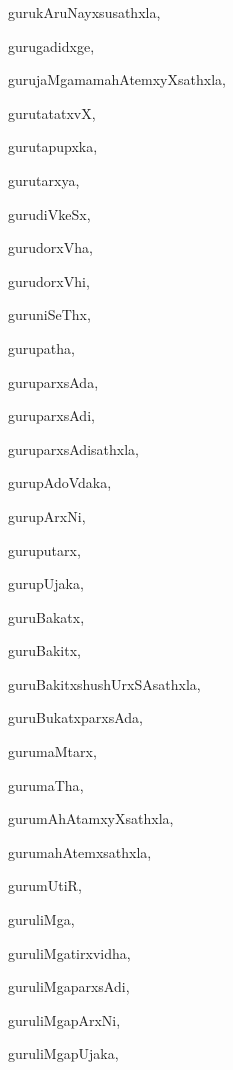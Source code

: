 \begin{multicols}{2}
{gurukAruNayxsusathxla}, \pageref{gurukAruNayxsusathxla}

{gurugadidxge}, \pageref{gurugadidxge}

{gurujaMgamamahAtemxyXsathxla}, \pageref{gurujaMgamamahAtemxyXsathxla}

{gurutatatxvX}, \pageref{gurutatatxvX}

{gurutapupxka}, \pageref{gurutapupxka}

{gurutarxya}, \pageref{gurutarxya}

{gurudiVkeSx}, \pageref{gurudiVkeSx}

{gurudorxVha}, \pageref{gurudorxVha}

{gurudorxVhi}, \pageref{gurudorxVhi}

{guruniSeThx}, \pageref{guruniSeThx}

{gurupatha}, \pageref{gurupatha}

{guruparxsAda}, \pageref{guruparxsAda}

{guruparxsAdi}, \pageref{guruparxsAdi}

{guruparxsAdisathxla}, \pageref{guruparxsAdisathxla}

{gurupAdoVdaka}, \pageref{gurupAdoVdaka}

{gurupArxNi}, \pageref{gurupArxNi}

{guruputarx}, \pageref{guruputarx}

{gurupUjaka}, \pageref{gurupUjaka}

{guruBakatx}, \pageref{guruBakatx}

{guruBakitx}, \pageref{guruBakitx}

{guruBakitxshushUrxSAsathxla}, \pageref{guruBakitxshushUrxSAsathxla}

{guruBukatxparxsAda}, \pageref{guruBukatxparxsAda}

{gurumaMtarx}, \pageref{gurumaMtarx}

{gurumaTha}, \pageref{gurumaTha}

{gurumAhAtamxyXsathxla}, \pageref{gurumAhAtamxyXsathxla}

{gurumahAtemxsathxla}, \pageref{gurumahAtemxsathxla}

{gurumUtiR}, \pageref{gurumUtiR}

{guruliMga}, \pageref{guruliMga}

{guruliMgatirxvidha}, \pageref{guruliMgatirxvidha}

{guruliMgaparxsAdi}, \pageref{guruliMgaparxsAdi}

{guruliMgapArxNi}, \pageref{guruliMgapArxNi}

{guruliMgapUjaka}, \pageref{guruliMgapUjaka}


\end{multicols}
